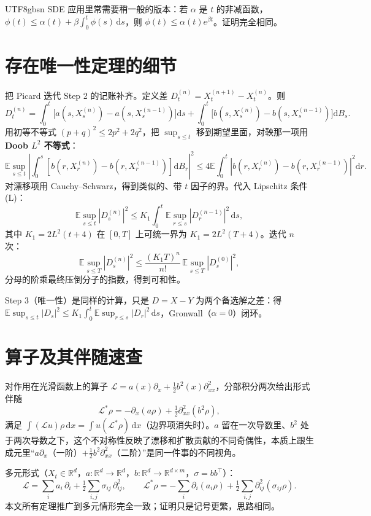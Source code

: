 \documentclass{article}
\theoremstyle{plain}
\theoremstyle{definition}
\begin{document}
\begin{CJK*}{UTF8}{gbsn}
SDE 应用里常需要稍一般的版本：若 $\alpha$ 是 $t$ 的非减函数，$\phi(t)\le\alpha(t)+\beta\!\int_0^t\phi(s)\,\mathrm{d}s$，则 $\phi(t)\le\alpha(t)e^{\beta t}$。证明完全相同。

\section{存在唯一性定理的细节\label{app:exuniq}}

把 Picard 迭代 Step 2 的记账补齐。定义差 $D^{(n)}_t=X^{(n+1)}_t-X^{(n)}_t$。则
\[
  D^{(n)}_t=\int_0^t\!\bigl[a(s,X^{(n)}_s)-a(s,X^{(n-1)}_s)\bigr]\mathrm{d}s+\int_0^t\!\bigl[b(s,X^{(n)}_s)-b(s,X^{(n-1)}_s)\bigr]\mathrm{d}B_s.
\]
用初等不等式 $(p+q)^2\le 2p^2+2q^2$，把 $\sup_{s\le t}$ 移到期望里面，对鞅那一项用 \textbf{Doob $L^2$ 不等式}：
\[
  \mathbb{E}\sup_{s\le t}\!\left|\int_0^s\![b(r,X^{(n)}_r)-b(r,X^{(n-1)}_r)]\mathrm{d}B_r\right|^2\le 4\mathbb{E}\!\int_0^t\!|b(r,X^{(n)}_r)-b(r,X^{(n-1)}_r)|^2\mathrm{d}r.
\]
对漂移项用 Cauchy--Schwarz，得到类似的、带 $t$ 因子的界。代入 Lipschitz 条件 (L)：
\[
  \mathbb{E}\sup_{s\le t}|D^{(n)}_s|^2\le K_1\!\int_0^t\mathbb{E}\sup_{r\le s}|D^{(n-1)}_r|^2\,\mathrm{d}s,
\]
其中 $K_1=2L^2(t+4)$ 在 $[0,T]$ 上可统一界为 $K_1=2L^2(T+4)$。迭代 $n$ 次：
\[
  \mathbb{E}\sup_{s\le T}|D^{(n)}_s|^2\le \frac{(K_1 T)^n}{n!}\,\mathbb{E}\sup_{s\le T}|D^{(0)}_s|^2,
\]
分母的阶乘最终压倒分子的指数，得到可和性。

Step 3（唯一性）是同样的计算，只是 $D=X-Y$ 为两个备选解之差：得 $\mathbb{E}\sup_{s\le t}|D_s|^2\le K_1\!\int_0^t\mathbb{E}\sup_{r\le s}|D_r|^2\,\mathrm{d}s$，Gronwall（$\alpha=0$）闭环。

\section{算子及其伴随速查\label{app:adjoint}}

对作用在光滑函数上的算子 $\mathcal{L}=a(x)\partial_x+\tfrac{1}{2}b^2(x)\partial_{xx}^2$，分部积分两次给出形式伴随
\[
  \mathcal{L}^*\rho=-\partial_x(a\rho)+\tfrac{1}{2}\partial_{xx}^2(b^2\rho),
\]
满足 $\int(\mathcal{L}u)\rho\,\mathrm{d}x=\int u(\mathcal{L}^*\rho)\,\mathrm{d}x$（边界项消失时）。$a$ 留在一次导数里、$b^2$ 处于两次导数之下，这个不对称性反映了漂移和扩散贡献的不同奇偶性，本质上跟生成元里“$a\partial_x$（一阶）$+\tfrac{1}{2}b^2\partial_{xx}^2$（二阶）”是同一件事的不同视角。

多元形式（$X_t\in\mathbb{R}^d$，$a:\mathbb{R}^d\to\mathbb{R}^d$，$b:\mathbb{R}^d\to\mathbb{R}^{d\times m}$，$\sigma=bb^\top$）：
\[
  \mathcal{L}=\sum_i a_i\,\partial_i+\tfrac{1}{2}\sum_{i,j}\sigma_{ij}\,\partial_{ij}^2,\qquad
  \mathcal{L}^*\rho=-\sum_i\partial_i(a_i\rho)+\tfrac{1}{2}\sum_{i,j}\partial_{ij}^2(\sigma_{ij}\rho).
\]
本文所有定理推广到多元情形完全一致；证明只是记号更繁，思路相同。

\clearpage %
\end{CJK*}
\end{document}

